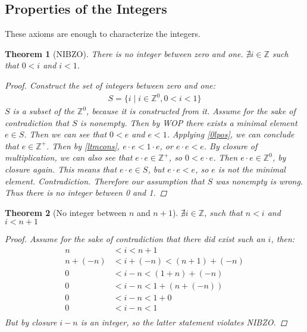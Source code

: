 \documentclass{article}
\newcommand{\ZZ}{\mathbb{Z}}
\newtheorem{thm}{Theorem}
\begin{document}
  \subsection{Properties of the Integers}
  These axioms are enough to characterize the integers.
  \begin{thm} [NIBZO] There is no integer between zero and one. $\nexists i \in \ZZ$ such that $0 < i$ and $i < 1$. 
    \begin{proof}
       Construct the set of integers between zero and one:
       \begin{align*}
         S = \{ i \mid i \in \ZZ^0, 0 < i < 1\}
       \end{align*}
       $S$ is a subset of the $\ZZ^0$, because it is constructed from it. Assume for the sake of contradiction that $S$ is nonempty. Then by WOP there exists a minimal element $e \in S$. Then we can see that $0 < e$ and $e < 1$. Applying \eqref{0lpos}, we can conclude that $e \in \ZZ^+$. Then by \eqref{ltmcons}, $e\cdot e < 1\cdot e$, or $e \cdot e < e$. By closure of multiplication, we can also see that $e \cdot e \in \ZZ^+$, so $0 < e \cdot e$. Then $e \cdot e \in \ZZ^0$, by closure again. This means that $e \cdot e \in S$, but $e \cdot e < e$, so $e$ is not the minimal element. Contradiction. Therefore our assumption that $S$ was nonempty is wrong. Thus there is no integer between 0 and 1.
    \end{proof}
  \end{thm}
  \begin{thm} [No integer between $n$ and $n+1$]\label{nibnn1} $\nexists i \in \ZZ$, such that $n < i$ and $i < n + 1$
    \begin{proof}
      Assume for the sake of contradiction that there did exist such an $i$, then:
      \begin{align*}
        n &< i < n + 1\\
        n + (-n) &< i + (-n) < (n + 1) + (-n)\\
        0 &< i - n < (1 + n) + (-n)\\
        0 &< i - n < 1 + (n + (-n))\\
        0 &< i - n < 1 + 0\\
        0 &< i - n < 1\\
      \end{align*}
      But by closure $i - n$ is an integer, so the latter statement violates NIBZO.
    \end{proof}
  \end{thm}
\end{document}
